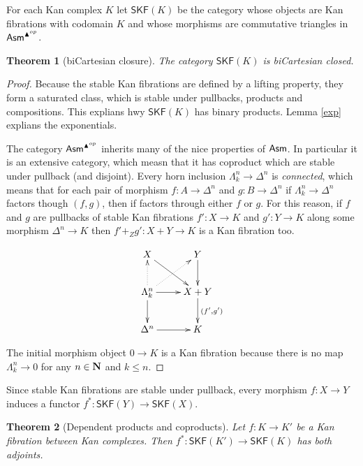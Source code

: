 \documentclass{amsart}
\theoremstyle{plain}
\newtheorem{theorem}{Theorem}
\theoremstyle{definition}
\begin{document}
\newcommand\kanfib{\mathsf{SKF}}
For each Kan complex $K$ let $\kanfib(K)$ be the category whose objects are Kan fibrations with codomain $K$ and whose morphisms are commutative triangles in $\mathsf{Asm}^{\blacktriangle^{op}}$.

\begin{theorem}[biCartesian closure] The category $\kanfib(K)$ is biCartesian closed.\label{bccc} \end{theorem}

\begin{proof} Because the stable Kan fibrations are defined by a lifting property, they form a saturated class, which is stable under pullbacks, products and compositions. This explians hwy $\kanfib(K)$ has binary products. Lemma \ref{exp} explians the exponentials. 

The category $\mathsf{Asm}^{\blacktriangle^{op}}$ inherits many of the nice properties of $\mathsf{Asm}$. In particular it is an extensive category, which measn that it has coproduct which are stable under pullback (and disjoint). Every horn inclusion $\Lambda^n_k \to \Delta^n$ is \emph{connected}, which means that for each pair of morphism $f:A\to \Delta^n$ and $g:B\to \Delta^n$ if $\Lambda^n_k \to \Delta^n$ factors though $(f,g)$, then if factors through either $f$ or $g$. For this reason, if $f$ and $g$ are pullbacks of stable Kan fibrations $f':X\to K$ and $g':Y\to K$ along some morphism $\Delta^n\to K$ then $f'+_Z g':X+Y \to K$ is a Kan fibration too.

\[\xymatrix{
X \ar[dr] & Y \ar[d]\\ 
\Lambda^n_k\ar[d] \ar[r]\ar@{.>}[u]\ar@{.>}[ur] &  X+Y \ar[d]^{(f',g')}\\
\Delta^n \ar[r] & K
}\]

The initial morphism object $0\to K$ is a Kan fibration because there is no map $\Lambda^n_k \to 0$ for any $n\in \mathbf{N}$ and $k\leq n$.
\end{proof}

\newcommand\ri{^*}
Since stable Kan fibrations are stable under pullback, every morphism $f:X\to Y$ induces a functor $f\ri:\kanfib(Y) \to \kanfib(X)$.

\begin{theorem}[Dependent products and coproducts] Let $f:K\to K'$ be a Kan fibration between Kan complexes. Then $f\ri:\kanfib(K') \to \kanfib(K)$ has both adjoints. \end{theorem}
\end{document}
